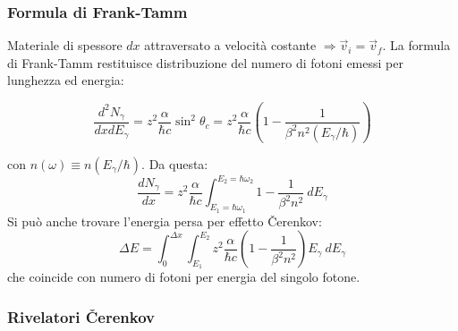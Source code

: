\documentclass[10pt, a4paper]{scrartcl}
\numberwithin{equation}{subsection}
\theoremstyle{style1}
\newenvironment{boxenv}[1][]{
    \begin{eqbox}[#1]
    }{
   \end{eqbox}
}
\begin{document}
\subsubsection{Formula di Frank-Tamm}

Materiale di spessore $dx$ attraversato a velocit\`a costante $\Rightarrow \vec{v}_i = \vec{v}_f$. La formula di Frank-Tamm restituisce distribuzione del numero di fotoni emessi per lunghezza ed energia:
\begin{boxenv}[]
\begin{equation}
	\frac{d^2 N_\gamma}{dxdE_\gamma} = z^2 \frac{\alpha  }{\hbar  c} \sin^2 \theta _c = z^2 \frac{\alpha }{\hbar  c}\left(1 - \frac{1}{\beta ^2 n^2(E_\gamma / \hbar )} \right) 
\end{equation}
\end{boxenv}
\noindent con $n(\omega) \equiv n(E_\gamma / \hbar )$. Da questa:
\begin{equation}
	\frac{d N_\gamma}{d x}  = z^2 \frac{\alpha }{\hbar  c}\int_{E_1 = \hbar  \omega_1} ^{E_2 = \hbar \omega_2} 1- \frac{1}{\beta ^2 n^2} \ dE_\gamma  
\end{equation}
Si pu\`o anche trovare l'energia persa per effetto \v Cerenkov:
\begin{equation}
	\Delta E = \int_{0} ^{\Delta  x} \int_{E_1} ^{E_2} z^2 \frac{\alpha }{\hbar c} \left(1- \frac{1}{\beta ^2 n^2}\right) E_\gamma \ dE_\gamma
\end{equation}
che coincide con numero di fotoni per energia del singolo fotone.
\subsubsection{Rivelatori \v Cerenkov}
\end{document}
